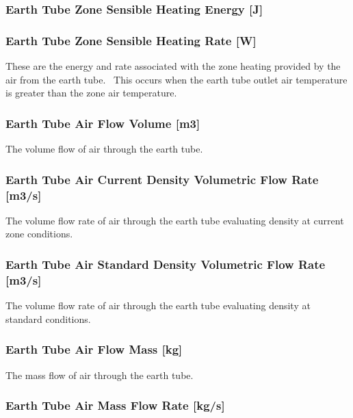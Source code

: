 \subsubsection{Earth Tube Zone Sensible Heating Energy {[}J{]}}\label{earth-tube-zone-sensible-heating-energy-j}

\subsubsection{Earth Tube Zone Sensible Heating Rate {[}W{]}}\label{earth-tube-zone-sensible-heating-rate-w}

These are the energy and rate associated with the zone heating provided by the air from the earth tube.~ This occurs when the earth tube outlet air temperature is greater than the zone air temperature.

\subsubsection{Earth Tube Air Flow Volume {[}m3{]}}\label{earth-tube-air-flow-volume-m3}

The volume flow of air through the earth tube.

\subsubsection{Earth Tube Air Current Density Volumetric Flow Rate {[}m3/s{]}}\label{earth-tube-air-current-density-volumetric-flow-rate-m3s}

The volume flow rate of air through the earth tube evaluating density at current zone conditions.

\subsubsection{Earth Tube Air Standard Density Volumetric Flow Rate {[}m3/s{]}}\label{earth-tube-air-standard-density-volumetric-flow-rate-m3s}

The volume flow rate of air through the earth tube evaluating density at standard conditions.

\subsubsection{Earth Tube Air Flow Mass {[}kg{]}}\label{earth-tube-air-flow-mass-kg}

The mass flow of air through the earth tube.

\subsubsection{Earth Tube Air Mass Flow Rate {[}kg/s{]}}\label{earth-tube-air-mass-flow-rate-kgs}

